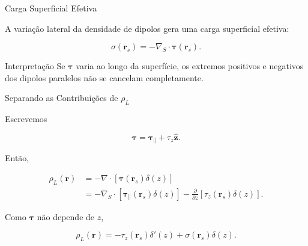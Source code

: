 \documentclass[aspectratio=169]{beamer}
\begin{document}
\begin{frame}{Carga Superficial Efetiva}

A variação lateral da densidade de dipolos gera uma carga superficial efetiva:

\begin{eqbox}
\begin{equation}
\sigma(\mathbf r_s)
=
-\nabla_S\cdot\boldsymbol{\tau}(\mathbf r_s).
\tag{4.40}
\label{eq:4.40}
\end{equation}
\end{eqbox}

\begin{mybox}{Interpretação}
Se \(\boldsymbol{\tau}\) varia ao longo da superfície, os extremos positivos e negativos dos dipolos paralelos não se cancelam completamente.
\end{mybox}

\end{frame}

\begin{frame}{Separando as Contribuições de \(\rho_L\)}

Escrevemos

\[
\boldsymbol{\tau}
=
\boldsymbol{\tau}_\parallel+\tau_z\hat{\mathbf z}.
\]

Então,

\begin{align}
\rho_L(\mathbf r)
&=
-\nabla\cdot
\left[
\boldsymbol{\tau}(\mathbf r_s)\delta(z)
\right]
\\
&=
-\nabla_S\cdot
\left[
\boldsymbol{\tau}_\parallel(\mathbf r_s)\delta(z)
\right]
-
\frac{\partial}{\partial z}
\left[
\tau_z(\mathbf r_s)\delta(z)
\right].
\end{align}

Como \(\boldsymbol{\tau}\) não depende de \(z\),

\begin{eqbox}
\begin{equation}
\rho_L(\mathbf r)
=
-\tau_z(\mathbf r_s)\delta'(z)
+
\sigma(\mathbf r_s)\delta(z).
\tag{4.41}
\label{eq:4.41}
\end{equation}
\end{eqbox}

\end{frame}
\end{document}
